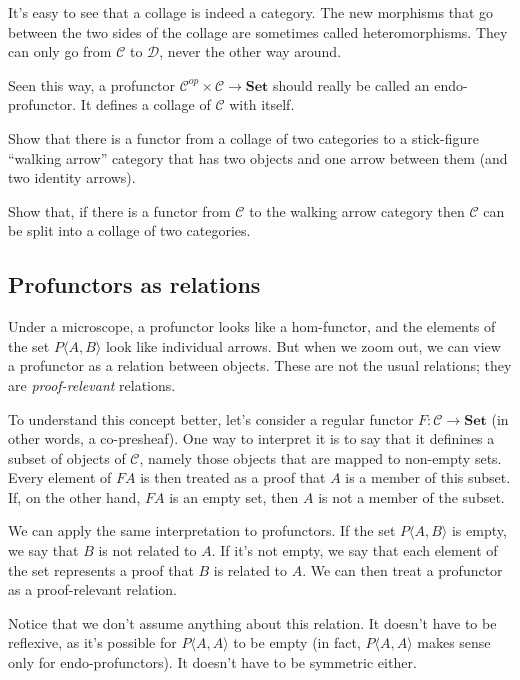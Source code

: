 \documentclass[DaoFP]{subfiles}
\begin{document}
It's easy to see that a collage is indeed a category. The new morphisms that go between the two sides of the collage are sometimes called heteromorphisms. They can only go from $\mathcal{C}$ to $\mathcal{D}$, never the other way around. 

Seen this way, a profunctor $ \mathcal{C}^{op} \times  \mathcal{C} \to \mathbf{Set}$ should really be called an endo-profunctor. It defines a collage of $\mathcal{C}$ with itself.

\begin{exercise}
Show that there is a functor from a collage of two categories to a stick-figure ``walking arrow'' category that has two objects and one arrow between them (and two identity arrows).
\end{exercise}
\begin{exercise}
Show that, if there is a functor from $\mathcal{C}$ to the walking arrow category then $\mathcal{C}$ can be split into a collage of two categories. 
\end{exercise}

\subsection{Profunctors as relations}

Under a microscope, a profunctor looks like a hom-functor, and the elements of the set $P \langle A, B \rangle$ look like individual arrows. But when we zoom out, we can view a profunctor as a relation between objects. These are not the usual relations; they are \emph{proof-relevant} relations.

To understand this concept better, let's consider a regular functor $F \colon \mathcal{C} \to \mathbf{Set}$ (in other words, a co-presheaf). One way to interpret it is to say that it definines a subset of objects of $\mathcal{C}$, namely those objects that are mapped to non-empty sets. Every element of $F A$ is then treated as a proof that $A$ is a member of this subset. If, on the other hand, $F A$ is an empty set, then $A$ is not a member of the subset.

We can apply the same interpretation to profunctors. If the set $P \langle A, B \rangle$ is empty, we say that $B$ is not related to $A$. If it's not empty, we say that each element of the set represents a proof that $B$ is related to $A$. We can then treat a profunctor as a proof-relevant relation. 

Notice that we don't assume anything about this relation. It doesn't have to be reflexive, as it's possible for $P \langle A, A \rangle$ to be empty (in fact, $P \langle A, A \rangle$ makes sense only for endo-profunctors). It doesn't have to be symmetric either.
\end{document}
